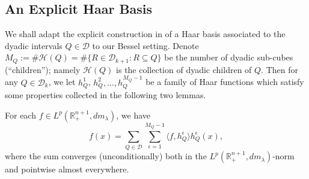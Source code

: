 \documentclass[12pt]{amsart}
\begin{document}
%






\subsection{An Explicit Haar Basis}\label{haardef}


We shall adapt the explicit construction in \cite{KLPW}  of a Haar basis associated to the dyadic intervals
$Q\in\mathcal{D}$ to our Bessel setting. Denote $M_Q := \#\mathcal H(Q) = \# \{R\in
\mathcal{D}_{k+1}\colon R\subseteq Q\}$ be the number of
dyadic sub-cubes (``children''); namely $\mathcal{H}(Q)$ is the collection of dyadic children of $Q$. Then for any   $Q\in \mathcal{D}_{k}$, we let $h_{Q}^{1}$, $h_{Q}^{2},\ldots, h_{Q}^{M_Q-1}$ be a family of Haar functions which satisfy some properties collected in the following two lemmas.



\begin{lemma}\label{thm:convergence}
For each $f\in
    L^p(\mathbb{R}_+^{n+1},dm_\lambda)$, we have
    \[
        f(x)
        =  \sum_{Q\in\mathcal{D}}\sum_{\epsilon=1}^{M_Q-1}
            \langle f,h^{\epsilon}_{Q}\rangle h^{\epsilon}_{Q}(x), %
    \]
    where the sum converges (unconditionally) both in the
    $L^p(\mathbb{R}_+^{n+1},dm_\lambda)$-norm and pointwise almost everywhere.
 \end{lemma}
\end{document}
